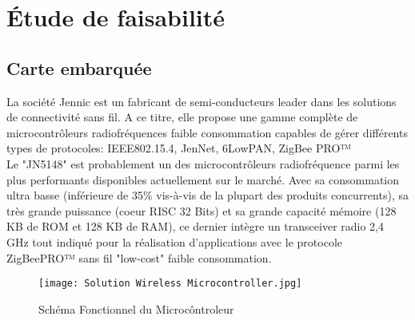 \section{Étude de faisabilité}

\subsection{Carte embarquée}

La société Jennic est un fabricant  de semi-conducteurs leader dans les solutions de connectivit\'e sans fil. A ce titre, elle propose une gamme compl\`ete de microcontrôleurs radiofr\'equences faible consommation capables de g\'erer diff\'erents types de protocoles: IEEE802.15.4, JenNet, 6LowPAN, ZigBee PRO™\\

Le "JN5148" est probablement un des microcontr\^oleurs radiofr\'equence parmi les plus performants disponibles actuellement sur le march\'e. Avec sa consommation ultra basse (inf\'erieure de 35\% vis-\`a-vis de la plupart des produits concurrents), sa tr\`es grande puissance (coeur RISC 32 Bits) et sa grande capacit\'e m\'emoire (128 KB de ROM et 128 KB de RAM), ce dernier int\`egre un transceiver radio 2,4 GHz tout indiqu\'e pour la r\'ealisation d'applications avec le protocole ZigBeePRO™ sans fil "low-cost" faible consommation.   \\

\begin{figure}[h]
\centering
\texttt{[image: Solution Wireless Microcontroller.jpg]}
\caption{\label{Solution Wireless Microcontroller}Sch\'ema Fonctionnel du Microc\^ontroleur}
\end{figure}

